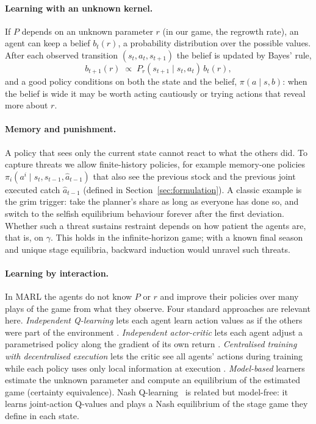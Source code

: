 \documentclass{article}
\begin{document}
\paragraph{Learning with an unknown kernel.} If $P$ depends on an unknown parameter $r$ (in our game, the regrowth rate), an agent can keep a belief $b_t(r)$, a probability distribution over the possible values. After each observed transition $(s_t,a_t,s_{t+1})$ the belief is updated by Bayes' rule,
\begin{equation}
b_{t+1}(r)\;\propto\;P_r(s_{t+1}\mid s_t,a_t)\,b_t(r),
\end{equation}
and a good policy conditions on both the state and the belief, $\pi(a\mid s,b)$: when the belief is wide it may be worth acting cautiously or trying actions that reveal more about $r$.

\paragraph{Memory and punishment.} A policy that sees only the current state cannot react to what the others did. To capture threats we allow finite-history policies, for example memory-one policies $\pi_i(a^i\mid s_t,s_{t-1},\hat a_{t-1})$ that also see the previous stock and the previous joint executed catch $\hat a_{t-1}$ (defined in Section~\ref{sec:formulation}). A classic example is the grim trigger: take the planner's share as long as everyone has done so, and switch to the selfish equilibrium behaviour forever after the first deviation. Whether such a threat sustains restraint depends on how patient the agents are, that is, on $\gamma$. This holds in the infinite-horizon game; with a known final season and unique stage equilibria, backward induction would unravel such threats.

\paragraph{Learning by interaction.} In MARL the agents do not know $P$ or $r$ and improve their policies over many plays of the game from what they observe. Four standard approaches are relevant here. \emph{Independent Q-learning} lets each agent learn action values as if the others were part of the environment \cite{tan1993,watkins1992}. \emph{Independent actor-critic} lets each agent adjust a parametrised policy along the gradient of its own return \cite{sutton2018}. \emph{Centralised training with decentralised execution} lets the critic see all agents' actions during training while each policy uses only local information at execution \cite{lowe2017}. \emph{Model-based} learners estimate the unknown parameter and compute an equilibrium of the estimated game (certainty equivalence). Nash Q-learning~\cite{hu2003} is related but model-free: it learns joint-action Q-values and plays a Nash equilibrium of the stage game they define in each state.
\end{document}
